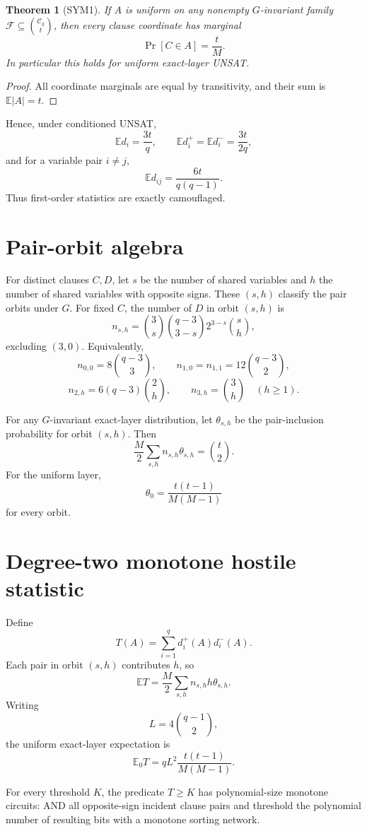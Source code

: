 \documentclass[11pt]{article}
\newtheorem{theorem}{Theorem}
\begin{document}
\begin{theorem}[SYM1]
If \(A\) is uniform on any nonempty \(G\)-invariant family
\(\mathcal F\subseteq\binom{\mathcal C_q}{t}\), then every clause coordinate
has marginal
\[
\Pr[C\in A]=\frac tM.
\]
In particular this holds for uniform exact-layer UNSAT.
\end{theorem}
\begin{proof}
All coordinate marginals are equal by transitivity, and their sum is
\(\mathbb E|A|=t\).
\end{proof}

Hence, under conditioned UNSAT,
\[
\mathbb E d_i=\frac{3t}{q},\qquad
\mathbb E d_i^+=\mathbb E d_i^-=\frac{3t}{2q},
\]
and for a variable pair \(i\ne j\),
\[
\mathbb E d_{ij}=\frac{6t}{q(q-1)}.
\]
Thus first-order statistics are exactly camouflaged.

\section{Pair-orbit algebra}
For distinct clauses \(C,D\), let \(s\) be the number of shared variables and
\(h\) the number of shared variables with opposite signs. These \((s,h)\)
classify the pair orbits under \(G\). For fixed \(C\), the number of \(D\) in
orbit \((s,h)\) is
\[
n_{s,h}
=
\binom3s\binom{q-3}{3-s}2^{3-s}\binom sh,
\]
excluding \((3,0)\). Equivalently,
\[
n_{0,0}=8\binom{q-3}{3},\qquad
n_{1,0}=n_{1,1}=12\binom{q-3}{2},
\]
\[
n_{2,h}=6(q-3)\binom2h,\qquad
n_{3,h}=\binom3h\quad(h\ge1).
\]

For any \(G\)-invariant exact-layer distribution, let \(\theta_{s,h}\) be the
pair-inclusion probability for orbit \((s,h)\). Then
\[
\frac M2\sum_{s,h}n_{s,h}\theta_{s,h}=\binom t2.
\tag{PAIR-SUM}
\]
For the uniform layer,
\[
\theta_0=\frac{t(t-1)}{M(M-1)}
\]
for every orbit.

\section{Degree-two monotone hostile statistic}
Define
\[
T(A)=\sum_{i=1}^q d_i^+(A)d_i^-(A).
\]
Each pair in orbit \((s,h)\) contributes \(h\), so
\[
\mathbb E T
=
\frac M2\sum_{s,h}n_{s,h}h\theta_{s,h}.
\]
Writing
\[
L=4\binom{q-1}{2},
\]
the uniform exact-layer expectation is
\[
\boxed{
\mathbb E_0T
=
qL^2\frac{t(t-1)}{M(M-1)}.
}
\tag{T0}
\]

For every threshold \(K\), the predicate \(T\ge K\) has polynomial-size
monotone circuits: AND all opposite-sign incident clause pairs and threshold
the polynomial number of resulting bits with a monotone sorting network.
\end{document}
